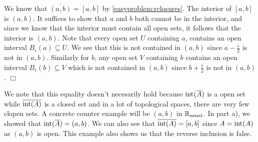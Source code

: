 \documentclass{article}
\begin{document}
 {
\begin{spacedenumerate}
    \item We know that $\overline{(a,b)} = [a,b]$ by \ref{easyproblem:rclosures}. The interior of $[a,b]$ is $(a,b)$. It suffices to show that $a$ and $b$ both cannot be in the interior, and since we know that the interior must contain all open sets, it follows that the interior is $(a,b)$. Note that every open set $U$ containing $a$, contains an open interval $B_{\epsilon}(a)\subseteq U$. We see that this is not contained in $(a,b)$ since $a-\frac{\epsilon}{2}$ is not in $(a,b)$. Similarly for $b$, any open set $V$ containing $b$ contains an open interval $B_{\epsilon}(b)\subseteq V$ which is not contained in $(a,b)$ since $b+ \frac{\epsilon}{2}$ is not in $(a,b)$. $\Box$
    \item We note that this equality doesn't necesarily hold because $\operatorname{int}(\overline{A})$ is a open set while $\overline{\operatorname{int}(A)}$ is a closed set and in a lot of topological spaces, there are very few clopen sets. A concrete counter example will be $(a,b)$ in $\mathbb{R}_{\text{usual}}$. In part a), we showed that $\operatorname{int}(\overline{A}) = (a,b)$. We can also see that $\overline{\operatorname{int}(A)} = [a,b]$ since $A = \operatorname{int}(A)$ as $(a,b)$ is open. This example also shows us that the reverse inclusion is false.
    

\end{spacedenumerate}}
\end{document}
